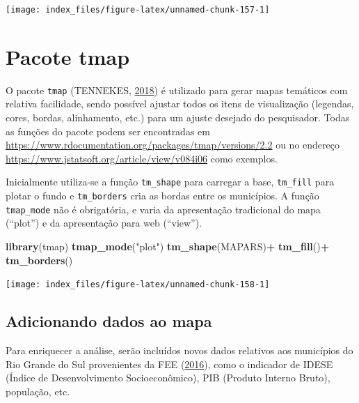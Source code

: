 \documentclass[12pt,brazil,oneside]{book}
\newenvironment{Shaded}{\begin{snugshade}}{\end{snugshade}}
\newcommand{\KeywordTok}[1]{\textcolor[rgb]{0.13,0.29,0.53}{\textbf{#1}}}
\newcommand{\NormalTok}[1]{#1}
\newcommand{\OperatorTok}[1]{\textcolor[rgb]{0.81,0.36,0.00}{\textbf{#1}}}
\newcommand{\StringTok}[1]{\textcolor[rgb]{0.31,0.60,0.02}{#1}}
\begin{document}
\begin{center}\texttt{[image: index\_files/figure-latex/unnamed-chunk-157-1]} \end{center}

\hypertarget{pacote-tmap}{%
\section{Pacote tmap}\label{pacote-tmap}}

O pacote \texttt{tmap} (TENNEKES, \protect\hyperlink{ref-tmap}{2018}) é utilizado para gerar mapas temáticos com relativa facilidade, sendo possível ajustar todos os itens de visualização (legendas, cores, bordas, alinhamento, etc.) para um ajuste desejado do pesquisador. Todas as funções do pacote podem ser encontradas em \url{https://www.rdocumentation.org/packages/tmap/versions/2.2} ou no endereço \url{https://www.jstatsoft.org/article/view/v084i06} como exemplos.

Inicialmente utiliza-se a função \texttt{tm\_shape} para carregar a base, \texttt{tm\_fill} para plotar o fundo e \texttt{tm\_borders} cria as bordas entre os municípios. A função \texttt{tmap\_mode} não é obrigatória, e varia da apresentação tradicional do mapa (``plot'') e da apresentação para web (``view'').

\begin{Shaded}
\begin{Highlighting}[]
\KeywordTok{library}\NormalTok{(tmap)}
\KeywordTok{tmap_mode}\NormalTok{(}\StringTok{"plot"}\NormalTok{)}
\KeywordTok{tm_shape}\NormalTok{(MAPARS)}\OperatorTok{+}
\StringTok{  }\KeywordTok{tm_fill}\NormalTok{()}\OperatorTok{+}
\StringTok{  }\KeywordTok{tm_borders}\NormalTok{()}
\end{Highlighting}
\end{Shaded}

\begin{center}\texttt{[image: index\_files/figure-latex/unnamed-chunk-158-1]} \end{center}

\hypertarget{adicionando-dados-ao-mapa}{%
\subsection{Adicionando dados ao mapa}\label{adicionando-dados-ao-mapa}}

Para enriquecer a análise, serão incluídos novos dados relativos aos municípios do Rio Grande do Sul provenientes da FEE (\protect\hyperlink{ref-FEE2016}{2016}), como o indicador de IDESE (Índice de Desenvolvimento Socioeconômico), PIB (Produto Interno Bruto), população, etc.
\end{document}
